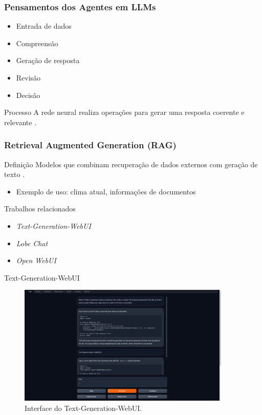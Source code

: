 \documentclass{beamer}
\begin{document}
\begin{frame}
    \frametitle{Pensamentos dos Agentes em LLMs}
    \begin{itemize}
        \item Entrada de dados
        \item Compreensão
        \item Geração de resposta
        \item Revisão
        \item Decisão
    \end{itemize}
    \begin{block}{Processo}
        A rede neural realiza operações para gerar uma resposta coerente e relevante \cite{NEURIPS2020_1457c0d6}.
    \end{block}
\end{frame}

\begin{frame}
    \frametitle{Retrieval Augmented Generation (RAG)}
    \begin{block}{Definição}
        Modelos que combinam recuperação de dados externos com geração de texto \cite{lewis2020retrieval}.
    \end{block}
    \begin{itemize}
        \item Exemplo de uso: clima atual, informações de documentos
    \end{itemize}
\end{frame}
\begin{frame}[allowframebreaks]{Trabalhos relacionados}
    
    \begin{itemize}
    \item \textit{Text-Generation-WebUI} \cite{text-generation-webui}
    \item \textit{Lobe Chat} \cite{Lobe-Chat}
    \item \textit{Open WebUI}\cite{open-webui}
\end{itemize}    


\end{frame}

\begin{frame}{Text-Generation-WebUI}
    \begin{figure}[!h]
    \centering
    \includegraphics[width=4.0in]{images/Text generation web UI.png}
    \caption{Interface do Text-Generation-WebUI.} 
    \label{fig:Text-Generation-WebUI}
    \end{figure}
\end{frame}
\end{document}
